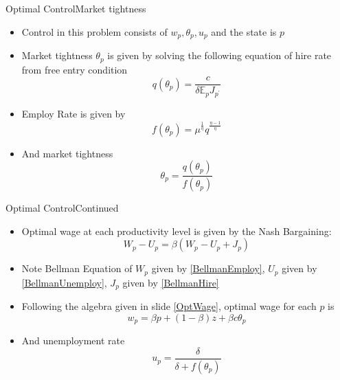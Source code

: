 \documentclass{beamer}
\begin{document}
\begin{frame}{Optimal Control}{Market tightness}
    \begin{itemize}
        \item Control in this problem consists of \(w_p, \theta_p, u_p\) and the state is \(p\)
        \item Market tightness \(\theta_p\) is given by solving the following equation of hire rate from free entry condition 
            \begin{equation}\label{HireRate}
            q(\theta_p) = \frac{c}{\delta \mathbb{E}_p J_{p^\prime}}\end{equation}
        \item Employ Rate is given by \begin{equation}\label{EmployRate}
            f(\theta_p) = \mu^\frac{1}{\eta} q^\frac{\eta-1}{\eta}\end{equation}
        \item And market tightness \begin{equation}
            \label{MarketTightness}
            \theta_p = \frac{q(\theta_p)}{f(\theta_p)}
            \end{equation}
    \end{itemize}
\end{frame}

\begin{frame}{Optimal Control}{Continued}
    \begin{itemize}
        \item Optimal wage at each productivity level is given by the Nash Bargaining: 
        \begin{equation}\label{Nash}W_p - U_p = \beta (W_p - U_p + J_p)\end{equation}
        \item Note Bellman Equation of \(W_p\) given by \ref{BellmanEmploy}, \(U_p\) given by \ref{BellmanUnemploy}, \(J_p\) given by \ref{BellmanHire}
        \item Following the algebra given in slide \ref{OptWage}, optimal wage for each \(p\) is \begin{equation}\label{OptimalWage}
            w_p = \beta p + (1-\beta)z + \beta c \theta_p\end{equation}
        \item And unemployment rate \begin{equation}\label{UnemployRate}
            u_p = \frac{\delta}{\delta + f(\theta_p)}
        \end{equation}
    \end{itemize}
\end{frame}
\end{document}
